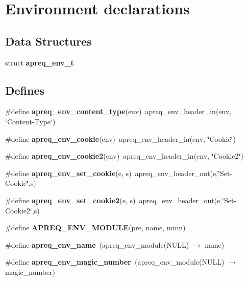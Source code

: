 \section{Environment declarations}
\label{group__ENV}
\subsection*{Data Structures}
\begin{CompactItemize}
\item 
struct {\bf apreq\_\-env\_\-t}
\end{CompactItemize}
\subsection*{Defines}
\begin{CompactItemize}
\item 
\#define {\bf apreq\_\-env\_\-content\_\-type}(env)\ apreq\_\-env\_\-header\_\-in(env, \char`\"{}Content-Type\char`\"{})\label{group__ENV_a10}

\item 
\#define {\bf apreq\_\-env\_\-cookie}(env)\ apreq\_\-env\_\-header\_\-in(env, \char`\"{}Cookie\char`\"{})\label{group__ENV_a11}

\item 
\#define {\bf apreq\_\-env\_\-cookie2}(env)\ apreq\_\-env\_\-header\_\-in(env, \char`\"{}Cookie2\char`\"{})\label{group__ENV_a12}

\item 
\#define {\bf apreq\_\-env\_\-set\_\-cookie}(e, s)\ apreq\_\-env\_\-header\_\-out(e,\char`\"{}Set-Cookie\char`\"{},s)\label{group__ENV_a13}

\item 
\#define {\bf apreq\_\-env\_\-set\_\-cookie2}(e, s)\ apreq\_\-env\_\-header\_\-out(e,\char`\"{}Set-Cookie2\char`\"{},s)\label{group__ENV_a14}

\item 
\#define {\bf APREQ\_\-ENV\_\-MODULE}(pre, name, mmn)
\item 
\#define {\bf apreq\_\-env\_\-name}\ (apreq\_\-env\_\-module(NULL) $\rightarrow$ name)\label{group__ENV_a16}

\item 
\#define {\bf apreq\_\-env\_\-magic\_\-number}\ (apreq\_\-env\_\-module(NULL) $\rightarrow$ magic\_\-number)\label{group__ENV_a17}

\end{CompactItemize}
